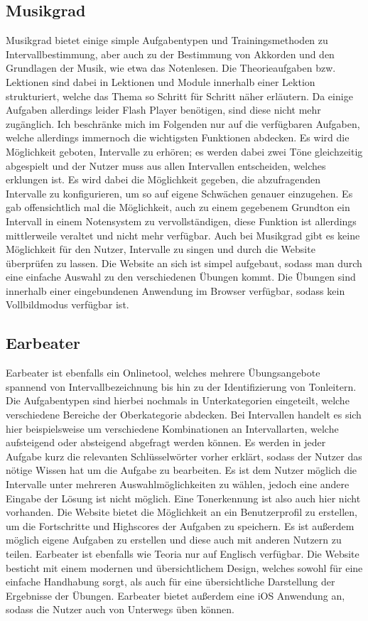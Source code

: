\subsection*{Musikgrad}
\label{sec:Musikgrad}
Musikgrad bietet einige simple Aufgabentypen und Trainingsmethoden zu Intervallbestimmung, aber auch zu der Bestimmung von Akkorden und den Grundlagen der Musik, wie etwa das Notenlesen. Die Theorieaufgaben bzw. Lektionen sind dabei in Lektionen und Module innerhalb einer Lektion strukturiert, welche das Thema so Schritt für Schritt näher erläutern. Da einige Aufgaben allerdings leider Flash Player benötigen, sind diese nicht mehr zugänglich. Ich beschränke mich im Folgenden nur auf die verfügbaren Aufgaben, welche allerdings immernoch die wichtigsten Funktionen abdecken. Es wird die Möglichkeit geboten, Intervalle zu erhören; es werden dabei zwei Töne gleichzeitig abgespielt und der Nutzer muss aus allen Intervallen entscheiden, welches erklungen ist. Es wird dabei die Möglichkeit gegeben, die abzufragenden Intervalle zu konfigurieren, um so auf eigene Schwächen genauer einzugehen. Es gab offensichtlich mal die Möglichkeit, auch zu einem gegebenem Grundton ein Intervall in einem Notensystem zu vervollständigen, diese Funktion
ist allerdings mittlerweile veraltet und nicht mehr verfügbar. Auch bei Musikgrad gibt es keine Möglichkeit für den Nutzer, Intervalle zu singen und durch die Website überprüfen zu lassen. Die Website an sich ist simpel aufgebaut, sodass man durch eine einfache Auswahl zu den verschiedenen Übungen kommt. Die Übungen sind innerhalb einer eingebundenen Anwendung im Browser verfügbar, sodass kein Vollbildmodus verfügbar ist. \cite{musikgrad}


\subsection*{Earbeater}
\label{sec:Earbeater}
Earbeater ist ebenfalls ein Onlinetool, welches mehrere Übungsangebote spannend von Intervallbezeichnung bis hin zu der Identifizierung von Tonleitern. Die Aufgabentypen sind hierbei nochmals in Unterkategorien eingeteilt, welche verschiedene Bereiche der 
Oberkategorie abdecken. Bei Intervallen handelt es sich hier beispielsweise um verschiedene Kombinationen an Intervallarten, welche aufsteigend oder absteigend abgefragt werden können. Es werden in jeder Aufgabe kurz die relevanten Schlüsselwörter vorher erklärt, sodass der Nutzer das nötige Wissen hat um die Aufgabe zu bearbeiten. Es ist dem Nutzer möglich die Intervalle unter mehreren Auswahlmöglichkeiten zu wählen, 
jedoch eine andere Eingabe der Lösung ist nicht möglich. Eine Tonerkennung ist also auch hier nicht vorhanden. Die Website bietet die Möglichkeit an ein Benutzerprofil zu erstellen, um die Fortschritte und Highscores der Aufgaben zu speichern. Es ist außerdem möglich eigene Aufgaben zu erstellen und diese 
auch mit anderen Nutzern zu teilen. Earbeater ist ebenfalls wie Teoria nur auf Englisch verfügbar. Die Website besticht mit einem modernen und übersichtlichem Design, welches sowohl für eine einfache Handhabung sorgt, als auch für eine übersichtliche Darstellung der Ergebnisse der Übungen. Earbeater bietet außerdem 
eine iOS Anwendung an, sodass die Nutzer auch von Unterwegs üben können. \cite{earbeater}

